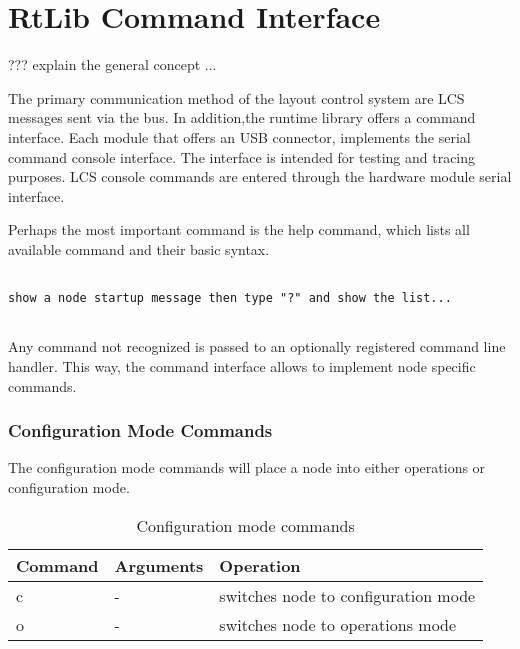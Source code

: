 \chapter{RtLib Command Interface}

???  explain the general concept ...

The primary communication method of the layout control system are LCS messages sent via the bus. In addition,the runtime library offers a command interface. Each module that offers an USB connector, implements the serial command console interface. The interface is intended for testing and tracing purposes. LCS console commands are entered through the hardware module serial interface. 

Perhaps the most important command is the help command, which lists all available command and  their basic syntax.

\lstset{style=codesnippetstyle}
\begin{lstlisting}

show a node startup message then type "?" and show the list...


\end{lstlisting}

Any command not recognized is passed to an optionally registered command line handler. This way, the command interface allows to implement node specific commands.

\subsection{Configuration Mode Commands}

The configuration mode commands will place a node into either operations or configuration mode.

\begin{table}[ht!]
    \begin{center}
        \renewcommand{\arraystretch}{1.2}
        \caption{Configuration mode commands}
        \begin{tabularx}{0.8\textwidth}{|l|l|X|}
            \hline
            \textbf{Command} & \textbf{Arguments}  & \textbf{Operation} \\
            \hline
            c & - & switches node to configuration mode\\
            \hline
            o & - & switches node to operations mode\\
            \hline
        \end{tabularx}
    \end{center}
\end{table}
\FloatBarrier


